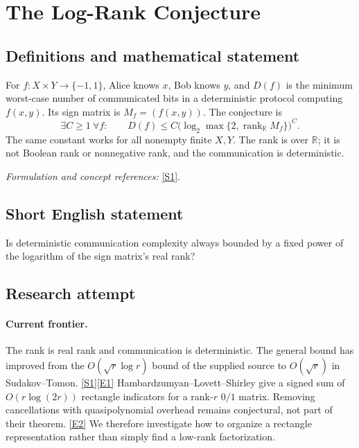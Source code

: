 \documentclass[11pt,a4paper]{article}
\newcommand{\R}{\mathbb{R}}
\newcommand{\sref}[2]{\hyperlink{source:#1:#2}{[S#2]}}
\newcommand{\eref}[2]{\hyperlink{extra:#1:#2}{[E#2]}}
\newif\ifshowcatalogue
\newcommand{\cataloguescope}[1]{\ifshowcatalogue
 \paragraph{Exact scope in the supplied catalogue.}
 \begin{quote}\small #1\end{quote}\fi}
\numberwithin{equation}{section}
\begin{document}
\setcounter{section}{0}
\clearpage
\section*{\texorpdfstring{The Log-Rank Conjecture}{The Log-Rank Conjecture}}\label{30006402}
\subsection{Definitions and mathematical statement}
For $f:X\times Y\to\{-1,1\}$, Alice knows $x$, Bob knows $y$, and $D(f)$ is the minimum worst-case number of communicated bits in a deterministic protocol computing $f(x,y)$. Its sign matrix is $M_f=(f(x,y))$. The conjecture is
\[
 \exists C\ge1\ \forall f:\qquad
 D(f)\le C\bigl(\log_2\max\{2,\operatorname{rank}_{\R}M_f\}\bigr)^C.
\]
The same constant works for all nonempty finite $X,Y$. The rank is over $\R$; it is not Boolean rank or nonnegative rank, and the communication is deterministic.
\par\smallskip\textit{Formulation and concept references:} \sref{30006402}{1}.
\cataloguescope{Prove that there is a universal constant C >= 1 such that, for every Boolean function f:X x Y -> \{-1,1\} on finite nonempty sets X,Y, D(f) <= C[log\_2 max\{2,rank\_R(M\_f)\}]\textasciicircum{}C, where M\_f(x,y)=f(x,y) is its sign communication matrix and D(f) is deterministic two-party communication complexity in bits.}
\subsection{Short English statement}
Is deterministic communication complexity always bounded by a fixed power of the logarithm of the sign matrix's real rank?
\subsection{Research attempt}

\paragraph{Current frontier.}
The rank is real rank and communication is deterministic. The general bound
has improved from the $O(\sqrt r\log r)$ bound of the supplied source to
$O(\sqrt r)$ in Sudakov--Tomon. \sref{30006402}{1}\eref{30006402}{1}
Hambardzumyan--Lovett--Shirley give a signed sum of $O(r\log(2r))$ rectangle
indicators for a rank-$r$ $0/1$ matrix. Removing cancellations with
quasipolynomial overhead remains conjectural, not part of their theorem.
\eref{30006402}{2} We therefore investigate how to organize a rectangle
representation rather than simply find a low-rank factorization.
\end{document}
